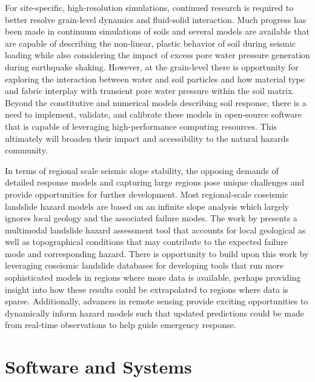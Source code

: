 For site-specific, high-resolution simulations, continued research is required to better resolve grain-level dynamics and fluid-solid interaction. Much progress has been made in continuum simulations of soils and several models are available that are capable of describing the non-linear, plastic behavior of soil during seismic loading while also considering the impact of excess pore water pressure generation during earthquake shaking. However, at the grain-level there is opportunity for exploring the interaction between water and soil particles and how material type and fabric interplay with transient pore water pressure within the soil matrix. Beyond the constitutive and numerical models describing soil response, there is a need to implement, validate, and calibrate these models in open-source software that is capable of leveraging high-performance computing resources. This ultimately will broaden their impact and accessibility to the natural hazards community.

In terms of regional scale seismic slope stability, the opposing demands of detailed response models and capturing large regions pose unique challenges and provide opportunities for further development. Most regional-scale coseismic landslide hazard models are based on an infinite slope analysis which largely ignores local geology and the associated failure modes. The work by \cite{grant2016multimodal} presents a multimodal landslide hazard assessment tool that accounts for local geological as well as topographical conditions that may contribute to the expected failure mode and corresponding hazard. There is opportunity to build upon this work by leveraging coseismic landslide databases for developing tools that run more sophisticated models in regions where more data is available, perhaps providing insight into how these results could be extrapolated to regions where data is sparse. Additionally, advances in remote sensing provide exciting opportunities to dynamically inform hazard models such that updated predictions could be made from real-time observations to help guide emergency response.


\section{Software and Systems}
\label{sec:eq_landslide_tools}

